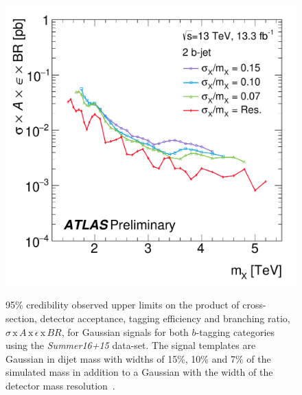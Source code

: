 \begin{figure}[!ht]
  \begin{center}
    \captionsetup[subfigure]{aboveskip=0pt,justification=centering}
         {\includegraphics[width=0.47\linewidth, angle=0]{figs/Dibjet/ICHEP/lim-summer_gauss_bb.pdf}}
  \end{center}
  \caption[95\% credibility observed upper limits
    on the product of cross-section, detector acceptance, tagging efficiency and branching ratio
    ($\sigma\,\text{x}\,\mathit{A}\,\text{x}\,\epsilon\,\text{x}\,\mathit{BR}$)
    for Gaussian signals using the \textit{Summer16+15} data-set.]
  {95\% credibility observed upper limits
    on the product of cross-section, detector acceptance, tagging efficiency and branching ratio,
    $\sigma\,\text{x}\,\mathit{A}\,\text{x}\,\epsilon\,\text{x}\,\mathit{BR}$,
    for Gaussian signals for both $b$-tagging categories using the \textit{Summer16+15} data-set.
    The signal templates are Gaussian in dijet  mass with
    widths of 15\%, 10\% and 7\% of the simulated mass
    in addition to a Gaussian with the width of the detector mass resolution~\cite{dibjet-ichep_conf}.
  }
  \label{fig:lim-summer_gauss}
\end{figure}

